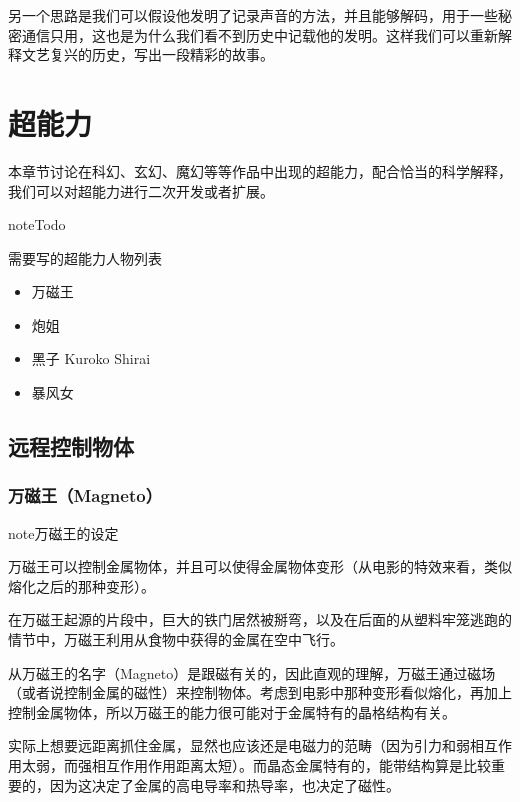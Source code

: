 \documentclass[letterpaper,10pt,english]{sphinxmanual}
\begin{document}
另一个思路是我们可以假设他发明了记录声音的方法，并且能够解码，用于一些秘密通信只用，这也是为什么我们看不到历史中记载他的发明。这样我们可以重新解释文艺复兴的历史，写出一段精彩的故事。


\section{超能力}
\label{superpower::doc}\label{superpower:id1}
本章节讨论在科幻、玄幻、魔幻等等作品中出现的超能力，配合恰当的科学解释，我们可以对超能力进行二次开发或者扩展。

\begin{notice}{note}{Todo}

需要写的超能力人物列表
\begin{itemize}
\item {} 
万磁王

\item {} 
炮姐

\item {} 
黑子 Kuroko Shirai

\item {} 
暴风女

\end{itemize}
\end{notice}


\subsection{远程控制物体}
\label{superpower:id2}

\subsubsection{万磁王（Magneto）}
\label{superpower:magneto}
\begin{notice}{note}{万磁王的设定}

万磁王可以控制金属物体，并且可以使得金属物体变形（从电影的特效来看，类似熔化之后的那种变形）。

在万磁王起源的片段中，巨大的铁门居然被掰弯，以及在后面的从塑料牢笼逃跑的情节中，万磁王利用从食物中获得的金属在空中飞行。
\end{notice}

从万磁王的名字（Magneto）是跟磁有关的，因此直观的理解，万磁王通过磁场（或者说控制金属的磁性）来控制物体。考虑到电影中那种变形看似熔化，再加上控制金属物体，所以万磁王的能力很可能对于金属特有的晶格结构有关。

实际上想要远距离抓住金属，显然也应该还是电磁力的范畴（因为引力和弱相互作用太弱，而强相互作用作用距离太短）。而晶态金属特有的，能带结构算是比较重要的，因为这决定了金属的高电导率和热导率，也决定了磁性。
\end{document}
